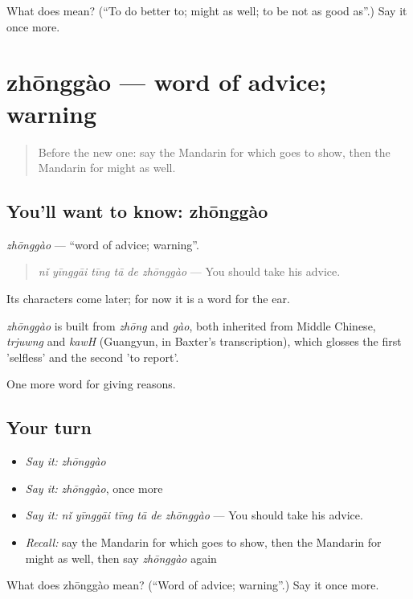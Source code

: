 \begin{tcolorbox}[breakable,colback=teal!4,colframe=teal!35!black,title={Before you move on}]
What does  mean? (\textquotedblleft{}To do better to; might as well; to be not as good as\textquotedblright{}.) Say it once more.
\end{tcolorbox}
\section[zhōnggào]{zhōnggào — word of advice; warning}

\label{lesson:ZH-C365-zhonggao}



\begin{quote}
Before the new one: say the Mandarin for which goes to show, then the Mandarin for might as well.
\end{quote}

\subsection*{You'll want to know: zhōnggào}
\emph{zhōnggào} — \textquotedblleft{}word of advice; warning\textquotedblright{}.

\begin{quote}
\emph{nǐ yīnggāi tīng tā de zhōnggào} — You should take his advice.
\end{quote}

Its characters come later; for now it is a word for the ear.

\begin{cousinweb}
\emph{zhōnggào} is built from \emph{zhōng} and \emph{gào}, both inherited from Middle Chinese, \emph{trjuwng} and \emph{kawH} (Guangyun, in Baxter's transcription), which glosses the first 'selfless' and the second 'to report'.
\end{cousinweb}

\begin{grammarlens}[title={What you've built}]
One more word for giving reasons.
\end{grammarlens}

\subsection*{Your turn}
\begin{itemize}
\raggedright
  \item \emph{Say it:} \emph{zhōnggào}
  \item \emph{Say it:} \emph{zhōnggào}, once more
  \item \emph{Say it:} \emph{nǐ yīnggāi tīng tā de zhōnggào} — You should take his advice.
  \item \emph{Recall:} say the Mandarin for which goes to show, then the Mandarin for might as well, then say \emph{zhōnggào} again
\end{itemize}

\begin{tcolorbox}[breakable,colback=teal!4,colframe=teal!35!black,title={Before you move on}]
What does zhōnggào mean? (\textquotedblleft{}Word of advice; warning\textquotedblright{}.) Say it once more.
\end{tcolorbox}
